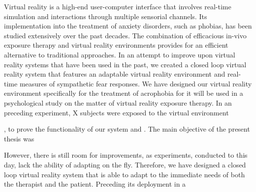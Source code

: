 
Virtual reality is a high-end user-computer interface that involves real-time simulation and interactions through multiple sensorial channels. Its implementation into the treatment of anxiety disorders, such as phobias, has been studied extensively over the past decades. The combination of efficacious in-vivo exposure therapy and virtual reality environments provides for an efficient alternative to traditional approaches. In an attempt to improve upon virtual reality systems that have been used in the past, we created a closed loop virtual reality system that features an adaptable virtual reality environment and real-time measures of sympathetic fear responses. We have designed our virtual reality environment specifically for the treatment of acrophobia for it will be used in a psychological study on the matter of virtual reality exposure therapy. In an preceding experiment, X subjects were exposed to the virtual environment

, to prove the functionality of our system and . The main objective of the present thesis was

 However, there is still room for improvements, as experiments, conducted to this day, lack the ability of adapting on the fly. Therefore, we have designed a closed loop virtual reality system that is able to adapt to the immediate needs of both the therapist and the patient. Preceding its deployment in a 








